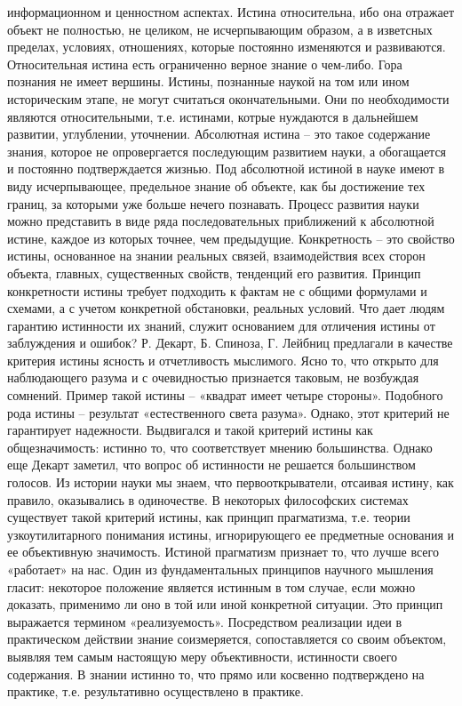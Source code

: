 \documentclass[12pt]{article}
\begin{document}
информационном и ценностном аспектах.
Истина относительна, ибо она отражает объект не полностью, не целиком, не исчерпывающим образом, а в
изветсных пределах, условиях, отношениях, которые постоянно изменяются и развиваются. Относительная
истина есть ограниченно верное знание о чем-либо. Гора познания не имеет вершины. Истины, познанные
наукой на том или ином историческим этапе, не могут считаться окончательными. Они по необходимости
являются относительными, т.е. истинами, котрые нуждаются в дальнейшем развитии, углублении, уточнении.
Абсолютная истина – это такое содержание знания, которое не опровергается последующим развитием науки, а
обогащается и постоянно подтверждается жизнью. Под абсолютной истиной в науке имеют в виду
исчерпывающее, предельное знание об объекте, как бы достижение тех границ, за которыми уже больше нечего
познавать. Процесс развития науки можно представить в виде ряда последовательных приближений к
абсолютной истине, каждое из которых точнее, чем предыдущие.
Конкретность – это свойство истины, основанное на знании реальных связей, взаимодействия всех сторон
объекта, главных, существенных свойств, тенденций его развития. Принцип конкретности истины требует
подходить к фактам не с общими формулами и схемами, а с учетом конкретной обстановки, реальных условий.
Что дает людям гарантию истинности их знаний, служит основанием для отличения истины от заблуждения и
ошибок?
Р. Декарт, Б. Спиноза, Г. Лейбниц предлагали в качестве критерия истины ясность и отчетливость мыслимого.
Ясно то, что открыто для наблюдающего разума и с очевидностью признается таковым, не возбуждая сомнений.
Пример такой истины – «квадрат имеет четыре стороны». Подобного рода истины – результат «естественного
света разума». Однако, этот критерий не гарантирует надежности.
Выдвигался и такой критерий истины как общезначимость: истинно то, что соответствует мнению
большинства. Однако еще Декарт заметил, что вопрос об истинности не решается большинством голосов. Из
истории науки мы знаем, что первооткрыватели, отсаивая истину, как правило, оказывались в одиночестве.
В некоторых философских системах существует такой критерий истины, как принцип прагматизма, т.е. теории
узкоутилитарного понимания истины, игнорирующего ее предметные основания и ее объективную значимость.
Истиной прагматизм признает то, что лучше всего «работает» на нас.
Один из фундаментальных принципов научного мышления гласит: некоторое положение является истинным в
том случае, если можно доказать, применимо ли оно в той или иной конкретной ситуации. Это принцип
выражается термином «реализуемость». Посредством реализации идеи в практическом действии знание
соизмеряется, сопоставляется со своим объектом, выявляя тем самым настоящую меру объективности,
истинности своего содержания. В знании истинно то, что прямо или косвенно подтверждено на практике, т.е.
результативно осуществлено в практике.
\end{document}
